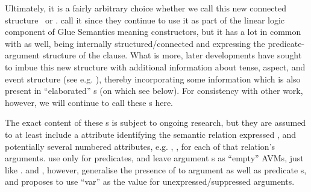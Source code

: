 \documentclass[output=paper]{langscibook}
\begin{document}
\ea\label{ex:new-architecture}
\hspace*{2em}
\z
%

Ultimately, it is a fairly arbitrary choice whether we call this new connected
structure \sstruc\ or \astruc. \citet{AsudGior12} call it \sstruc{} since they
continue to use it as part of the linear logic component of Glue Semantics
meaning constructors, but it has a lot in common with
 \astruc{} as well, being internally
structured\slash connected and expressing the predicate-argument structure of
the clause. What is more, later developments have sought to imbue this new
structure with additional information about tense, aspect, and event structure
(see e.g. \citealt{Lowe2014,Lovestrand2018,Lovestrand2020,findlay2021}), thereby
incorporating some information which is also present in 
``elaborated'' \astruc{}s (on which see below). For consistency with other work,
however, we will continue to call these \sstruc{}s here.

The exact content of these \sstruc{}s is subject to ongoing research, but they
are assumed to at least include a \REL attribute identifying the semantic
relation expressed \citep[cf.][24]{asudeh2013constructions}, and potentially
several numbered \ARG attributes, e.g. , , for each of that
relation's arguments. \citet{AsudGior12} use \REL only for predicates, and leave
argument \sstruc{}s as ``empty'' AVMs, just like \citet{butt1997architecture}.
\citet[ch.~8.3]{Lovestrand2018} and \citet[135f.]{Findlay2020}, however,
generalise the presence of \REL to argument as well as predicate \sstruc{}s, and
\citet[144]{Findlay2020} proposes to use ``var'' as the \REL value for
unexpressed\slash suppressed arguments.
\end{document}
